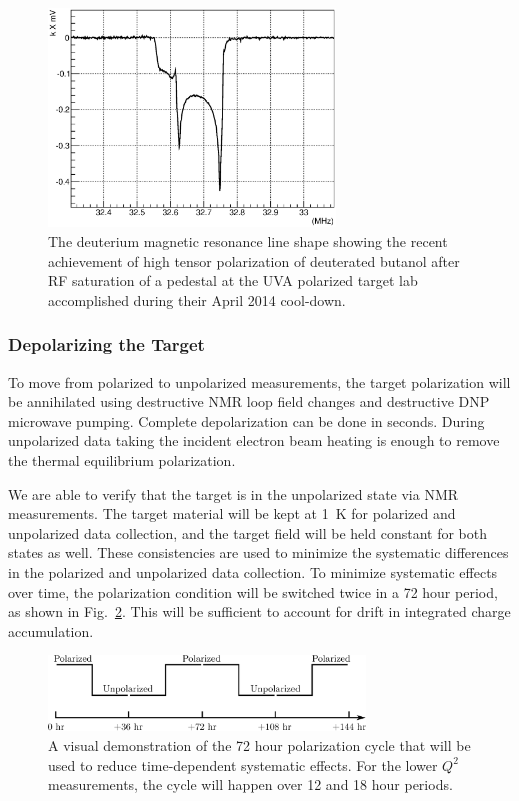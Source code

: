 \begin{figure}
\centering
\includegraphics[width=3.0in,clip]{figs/study.eps}
\caption{The deuterium magnetic resonance line shape showing the recent achievement of 
high tensor polarization of deuterated butanol after RF saturation of a pedestal at the UVA polarized target lab accomplished during their April 2014 cool-down.}  
\label{fig:study}
\end{figure}

\subsubsection{Depolarizing the Target}
To move from polarized to unpolarized measurements, the target
polarization will be annihilated using destructive NMR loop field changes and destructive DNP microwave pumping. Complete depolarization can be done in seconds.
During unpolarized data taking the incident electron beam heating is enough to remove the thermal equilibrium polarization.

We are able to verify that the target is in the unpolarized state via NMR measurements.  The target material will be
kept at 1~K for polarized and unpolarized data collection, and the target field
will be held constant for both states as well.  These
consistencies are used to minimize the systematic differences in the
polarized and unpolarized data collection.  To minimize systematic effects over
time, the polarization condition will be switched twice in a 72 hour period, as shown in Fig.~\ref{fig:polcycle}. 
This will be sufficient to account for drift in integrated charge accumulation.

\begin{figure}
\centering
\includegraphics[width=0.75\textwidth,clip]{figs/pol_cycle.eps}
\caption{A visual demonstration of the 72 hour polarization cycle that will be used to reduce time-dependent systematic effects. For the lower $Q^2$ measurements, the cycle will happen over 12 and 18 hour periods.}  
\label{fig:polcycle}
\end{figure}

